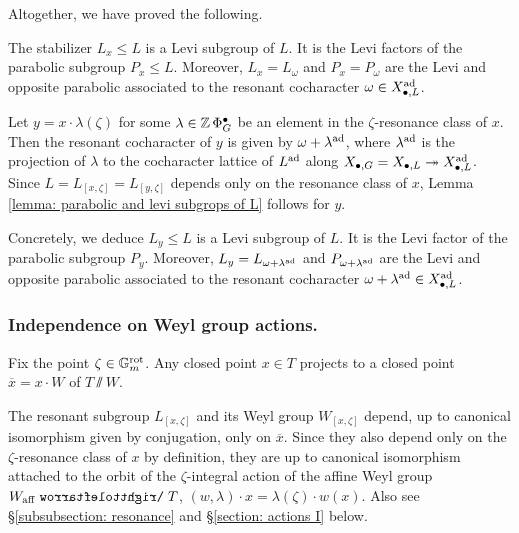 Altogether, we have proved the following.
\begin{lemma}\label{lemma: parabolic and levi subgrops of L}
The stabilizer $L_x \leq L$ is a Levi subgroup of $L$. It is the Levi factors of the parabolic subgroup $P_x \leq L$. Moreover, $L_x = L_{\omega}$ and $P_x = P_{\omega}$ are the Levi and opposite parabolic associated to the resonant cocharacter $\omega \in X_{\bullet, L}^{{\operatorname{ad}}}$. 
\end{lemma}

\begin{remark}\label{remark: parabolic and levi subgrops of L}
Let $y = x \cdot \lambda(\zeta)$ for some $\lambda \in \operatorname{\mathbb{Z}}\Phi^{\bullet}_G$ be an element in the $\zeta$-resonance class of $x$. Then the resonant cocharacter of $y$ is given by $\omega + \lambda^{\operatorname{ad}}$, where $\lambda^{\operatorname{ad}}$ is the projection of $\lambda$ to the cocharacter lattice of $L^{\operatorname{ad}}$ along $X_{\bullet, G} = X_{\bullet, L} \twoheadrightarrow X_{\bullet, L}^{\operatorname{ad}}$. Since $L = L_{[x, \zeta]} = L_{[y, \zeta]}$ depends only on the resonance class of $x$, Lemma \ref{lemma: parabolic and levi subgrops of L} follows for $y$.

Concretely, we deduce $L_y \leq L$ is a Levi subgroup of $L$. It is the Levi factor of the parabolic subgroup $P_{y}$. Moreover, $L_y = L_{\omega + \lambda^{\operatorname{ad}}}$ and $P_{\omega + \lambda^{\operatorname{ad}}}$ are the Levi and opposite parabolic associated to the resonant cocharacter $\omega + \lambda^{\operatorname{ad}} \in X_{\bullet, L}^{{\operatorname{ad}}}$.
\end{remark}



\subsubsection{Independence on Weyl group actions.}\label{subsubsection: independence on W-action}
Fix the point $\zeta \in \mathbb{G}_m^{\mathrm{rot}}$. Any closed point $x \in T$ projects to a closed point $\overline{x} = x \cdot W$ of $T\sslash W$. 


The resonant subgroup $L_{[x, \zeta]}$ and its Weyl group $W_{[x, \zeta]}$ depend, up to canonical isomorphism given by conjugation, only on $\overline{x}$. 
%
Since they also depend only on the $\zeta$-resonance class of $x$ by definition, they are up to canonical isomorphism attached to the orbit of the $\zeta$-integral action of the affine Weyl group $W_{\aff} \acts T$, $(w, \lambda) \cdot x = \lambda(\zeta) \cdot w(x)$. Also see \S \ref{subsubsection: resonance} and \S \ref{section: actions I} below.



